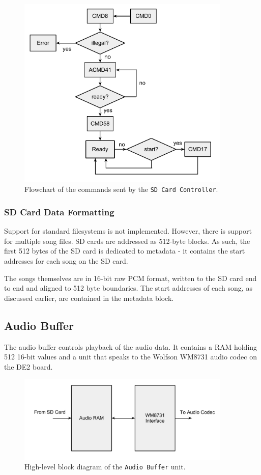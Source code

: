 \documentclass{article}
\begin{document}
\begin{figure}[H]
	\centering
	\includegraphics[width=4in]{sd-controller}
	\caption{Flowchart of the commands sent by the \texttt{SD Card Controller}. }
\end{figure}

\subsubsection{SD Card Data Formatting}

Support for standard filesystems is not implemented. However, there is support
for multiple song files. SD cards are addressed as 512-byte blocks. As such,
the first 512 bytes of the SD card is dedicated to metadata - it contains the
start addresses for each song on the SD card.

The songs themselves are in 16-bit raw PCM format, written to the SD card end
to end and aligned to 512 byte boundaries. The start addresses of each
song, as discussed earlier, are contained in the metadata block.

\subsection{Audio Buffer}

The audio buffer controls playback of the audio data. It contains a RAM
holding 512 16-bit values and a unit that speaks to the Wolfson WM8731
audio codec on the DE2 board.

\begin{figure}[H]
	\centering
	\includegraphics[width=4in]{audio-buffer}
	\caption{High-level block diagram of the \texttt{Audio Buffer} unit.}
\end{figure}
\end{document}
